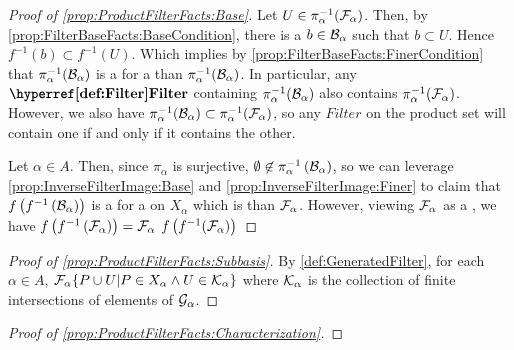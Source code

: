 \begin{prop}
\begin{proof}[Proof of \ref{prop:ProductFilterFacts:Base}]
    Let $U \in \pi_\alpha^{-1}(\mathcal{F}_\alpha)$. 
    Then, by 
    \ref{prop:FilterBaseFacts:BaseCondition}, there is a $b \in \mathcal{B}_\alpha$ such that 
    $b \subset U$. Hence $f^{-1}(b) \subset f^{-1}(U)$.
    Which implies by \ref{prop:FilterBaseFacts:FinerCondition} that
    $\pi_\alpha^{-1}(\mathcal{B}_\alpha)$ is a \FilterBase for a \FinerFilter \Filter 
    than $\pi_{\alpha}^{-1}(\mathcal{B}_\alpha)$. 
    In particular, any $\Filter$ containing $\pi_{\alpha}^{-1}(\mathcal{B}_\alpha)$ also contains 
    $\pi_{\alpha}^{-1}(\mathcal{F}_\alpha)$. 
    However, we also have $\pi_{\alpha}^{-1}(\mathcal{B}_\alpha) \subset \pi_{\alpha}^{-1}(\mathcal{F}_\alpha)$, so any $Filter$ on the product set will contain one if and only if it contains the other. 
    













    Let $\alpha \in A$. Then, since $\pi_\alpha$ is surjective, $\emptyset \not \in \pi_\alpha^{-1}\left( \mathcal{B}_\alpha\right)$, so we can leverage  \ref{prop:InverseFilterImage:Base}
    and \ref{prop:InverseFilterImage:Finer} to claim that 
    $f\left( f^{-1}\left( \mathcal{B}_{\alpha}\right)\right)$ is a \FilterBase for a \Filter on $X_\alpha$ which is 
    \FinerFilter than $\mathcal{F}_\alpha$. 
    However, viewing $\mathcal{F}_\alpha$ as a \FilterBase, we have $f\left( f^{-1}\left( \mathcal{F}_\alpha\right)\right)=\mathcal{F}_\alpha$ 
    $f\left( f^{-1}(\mathcal{F}_\alpha)\right)$
\end{proof}
\begin{proof}[Proof of \ref{prop:ProductFilterFacts:Subbasis}]
    By \ref{def:GeneratedFilter}, for each $\alpha \in A$, 
    $\mathcal{F}_\alpha \{P \cup U | P \in X_\alpha \wedge U \in \mathcal{K}_\alpha\}$ 
    where $\mathcal{K}_\alpha$ is the collection of finite intersections of 
    elements of $\mathcal{G}_\alpha$.


\end{proof}
\begin{proof}[Proof of \ref{prop:ProductFilterFacts:Characterization}]
\end{proof}
\end{prop}

